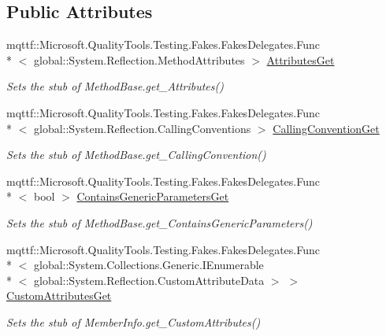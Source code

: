 \subsection*{Public Attributes}
\begin{DoxyCompactItemize}
\item 
mqttf\-::\-Microsoft.\-Quality\-Tools.\-Testing.\-Fakes.\-Fakes\-Delegates.\-Func\\*
$<$ global\-::\-System.\-Reflection.\-Method\-Attributes $>$ \hyperlink{class_system_1_1_reflection_1_1_fakes_1_1_stub_method_base_ade19f0d37b476ef91cb7361d779632d1}{Attributes\-Get}
\begin{DoxyCompactList}\small\item\em Sets the stub of Method\-Base.\-get\-\_\-\-Attributes()\end{DoxyCompactList}\item 
mqttf\-::\-Microsoft.\-Quality\-Tools.\-Testing.\-Fakes.\-Fakes\-Delegates.\-Func\\*
$<$ global\-::\-System.\-Reflection.\-Calling\-Conventions $>$ \hyperlink{class_system_1_1_reflection_1_1_fakes_1_1_stub_method_base_ad2a1ad1c7fb5c85738ab08b8af18ef3b}{Calling\-Convention\-Get}
\begin{DoxyCompactList}\small\item\em Sets the stub of Method\-Base.\-get\-\_\-\-Calling\-Convention()\end{DoxyCompactList}\item 
mqttf\-::\-Microsoft.\-Quality\-Tools.\-Testing.\-Fakes.\-Fakes\-Delegates.\-Func\\*
$<$ bool $>$ \hyperlink{class_system_1_1_reflection_1_1_fakes_1_1_stub_method_base_a8b8c1a68cb19b20500dcf96b6fbc31e3}{Contains\-Generic\-Parameters\-Get}
\begin{DoxyCompactList}\small\item\em Sets the stub of Method\-Base.\-get\-\_\-\-Contains\-Generic\-Parameters()\end{DoxyCompactList}\item 
mqttf\-::\-Microsoft.\-Quality\-Tools.\-Testing.\-Fakes.\-Fakes\-Delegates.\-Func\\*
$<$ global\-::\-System.\-Collections.\-Generic.\-I\-Enumerable\\*
$<$ global\-::\-System.\-Reflection.\-Custom\-Attribute\-Data $>$ $>$ \hyperlink{class_system_1_1_reflection_1_1_fakes_1_1_stub_method_base_aaac10f1ef28e84432a93528c9e14df10}{Custom\-Attributes\-Get}
\begin{DoxyCompactList}\small\item\em Sets the stub of Member\-Info.\-get\-\_\-\-Custom\-Attributes()\end{DoxyCompactList}\item 

\end{DoxyCompactItemize}
